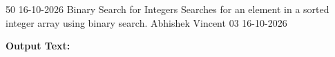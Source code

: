 \clearpage
\label{prog:50}
\programhead
  {50}
  {16-10-2026}
  {Binary Search for Integers}
  {Searches for an element in a sorted integer array using binary search.}
  {Abhishek Vincent}
  {03}
  {16-10-2026}

\divider
\textbf{Output Text:}\par
\vspace{2pt}

